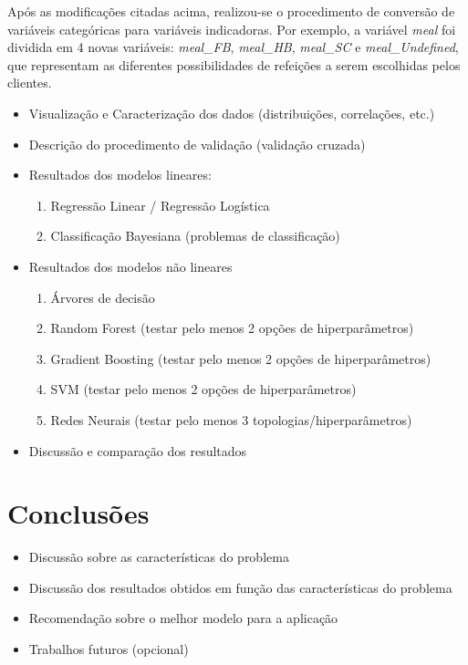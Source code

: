 \documentclass{homework}
\begin{document}
Após as modificações citadas acima, realizou-se o procedimento de conversão de variáveis categóricas para variáveis
indicadoras. Por exemplo, a variável \textit{meal} foi dividida em 4 novas variáveis: \textit{meal\_FB}, \textit{meal\_HB},
\textit{meal\_SC} e \textit{meal\_Undefined}, que representam as diferentes possibilidades de refeições a serem escolhidas
pelos clientes.

\begin{itemize}
    \color{red}
        \item Visualização e Caracterização dos dados (distribuições, correlações, etc.)
        \item Descrição do procedimento de validação (validação cruzada)
        \item Resultados dos modelos lineares:
            \begin{enumerate}
                \item Regressão Linear / Regressão Logística
                \item Classificação Bayesiana (problemas de classificação)
            \end{enumerate}
        \item Resultados dos modelos não lineares
            \begin{enumerate}
                \item Árvores de decisão
                \item Random Forest (testar pelo menos 2 opções de hiperparâmetros)
                \item Gradient Boosting (testar pelo menos 2 opções de hiperparâmetros)
                \item SVM (testar pelo menos 2 opções de hiperparâmetros)
                \item Redes Neurais (testar pelo menos 3 topologias/hiperparâmetros)
            \end{enumerate}
        \item Discussão e comparação dos resultados
\end{itemize}

\section{Conclusões}

\begin{itemize}
    \color{red}
        \item Discussão sobre as características do problema
        \item Discussão dos resultados obtidos em função das características do problema
        \item Recomendação sobre o melhor modelo para a aplicação
        \item Trabalhos futuros (opcional)
\end{itemize}
\end{document}
